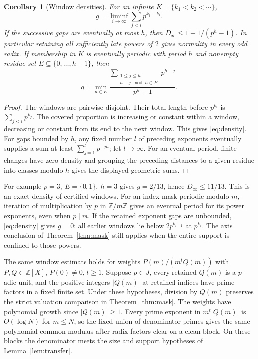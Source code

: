 \documentclass[11pt]{article}
\newtheorem{corollary}[theorem]{Corollary}
\newcommand{\Z}{\mathbb Z}
\newcommand{\dd}{D_{\infty}}
\begin{document}
\begin{corollary}[Window densities]\label{cor:density}
For an infinite \(K=\{k_1<k_2<\cdots\}\),
\begin{equation}\label{eq:density}
 g=\liminf_{i\to\infty}\sum_{j<i}p^{k_j-k_i}.
\end{equation}
If the successive gaps are eventually at most \(h\), then \(\dd\le 1-1/(p^h-1)\). In particular retaining all sufficiently late powers of \(2\) gives normality in every odd radix. If membership in \(K\) is eventually periodic with period \(h\) and nonempty residue set \(E\subseteq\{0,\ldots,h-1\}\), then
\[
 g=\min_{a\in E}\frac{\displaystyle\sum_{\substack{1\le j\le h\\a-j\bmod h\in E}}p^{h-j}}{p^h-1}.
\]
\end{corollary}
\begin{proof}
The windows are pairwise disjoint. Their total length before \(p^{k_i}\) is \(\sum_{j<i}p^{k_j}\). The covered proportion is increasing or constant within a window, decreasing or constant from its end to the next window. This gives \eqref{eq:density}. For gaps bounded by \(h\), any fixed number \(l\) of preceding exponents eventually supplies a sum at least \(\sum_{j=1}^l p^{-jh}\); let \(l\to\infty\). For an eventual period, finite changes have zero density and grouping the preceding distances to a given residue into classes modulo \(h\) gives the displayed geometric sums.
\end{proof}
For example \(p=3,\ E=\{0,1\},\ h=3\) gives \(g=2/13\), hence \(\dd\le11/13\). This is an exact density of certified windows. For an index mask periodic modulo \(m\), iteration of multiplication by \(p\) in \(\Z/m\Z\) gives an eventual period for its power exponents, even when \(p\mid m\). If the retained exponent gaps are unbounded, \eqref{eq:density} gives \(g=0\): all earlier windows lie below \(2p^{k_{i-1}}\) at \(p^{k_i}\). The axis conclusion of Theorem~\ref{thm:mask} still applies when the entire support is confined to those powers.

The same window estimate holds for weights \(P(m)/(m^t Q(m))\) with \(P,Q\in\Z[X]\), \(P(0)\ne0\), \(t\ge1\). Suppose \(p\in J\), every retained \(Q(m)\) is a \(p\)-adic unit, and the positive integers \(|Q(m)|\) at retained indices have prime factors in a fixed finite set. Under these hypotheses, division by \(Q(m)\) preserves the strict valuation comparison in Theorem~\ref{thm:mask}. The weights have polynomial growth since \(|Q(m)|\ge1\). Every prime exponent in \(m^t|Q(m)|\) is \(O(\log N)\) for \(m\le N\), so the fixed union of denominator primes gives the same polynomial common modulus after radix factors clear on a clean block. On these blocks the denominator meets the size and support hypotheses of Lemma~\ref{lem:transfer}.
\end{document}
